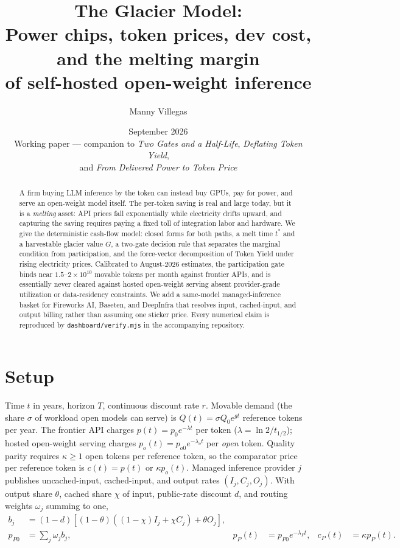 \documentclass[11pt]{article}
\title{The Glacier Model:\\ \large Power chips, token prices, dev cost, and the melting margin\\
of self-hosted open-weight inference}
\author{Manny Villegas}
\date{September 2026 \\ \small Working paper --- companion to \emph{Two Gates and a Half-Life},
\emph{Deflating Token Yield},\\ \small and \emph{From Delivered Power to Token Price}}
\begin{document}
\maketitle

\begin{abstract}
A firm buying LLM inference by the token can instead buy GPUs, pay for power, and serve an
open-weight model itself. The per-token saving is real and large today, but it is a
\emph{melting} asset: API prices fall exponentially while electricity drifts upward, and
capturing the saving requires paying a fixed toll of integration labor and hardware. We
give the deterministic cash-flow model: closed forms for both paths, a melt time $t^\ast$
and a harvestable glacier value $G$, a two-gate decision rule that separates the marginal
condition from participation, and the force-vector decomposition of Token Yield under
rising electricity prices. Calibrated to August-2026 estimates, the participation gate
binds near $1.5$--$2\times 10^{10}$ movable tokens per month against frontier APIs, and is
essentially never cleared against hosted open-weight serving absent provider-grade
utilization or data-residency constraints. We add a same-model managed-inference basket
for Fireworks AI, Baseten, and DeepInfra that resolves input, cached-input, and output
billing rather than assuming one sticker price. Every numerical claim is reproduced by
\texttt{dashboard/verify.mjs} in the accompanying repository.
\end{abstract}

\section{Setup}
Time $t$ in years, horizon $T$, continuous discount rate $r$. Movable demand (the share
$\sigma$ of workload open models can serve) is $Q(t)=\sigma Q_0 e^{gt}$ reference tokens
per year. The frontier API charges $p(t)=p_0 e^{-\lambda t}$ per token
($\lambda=\ln 2/t_{1/2}$); hosted open-weight serving charges $p_o(t)=p_{o0}e^{-\lambda_o t}$
per \emph{open} token. Quality parity requires $\kappa\ge 1$ open tokens per reference
token, so the comparator price per reference token is $c(t)=p(t)$ or $\kappa p_o(t)$.
Managed inference provider $j$ publishes uncached-input, cached-input, and output rates
$(I_j,C_j,O_j)$. With output share $\theta$, cached share $\chi$ of input, public-rate
discount $d$, and routing weights $\omega_j$ summing to one,
\begin{align}
b_j&=(1-d)\left[(1-\theta)((1-\chi)I_j+\chi C_j)+\theta O_j\right],\\
p_{P0}&=\sum_j\omega_jb_j, & p_P(t)&=p_{P0}e^{-\lambda_Pt}, & c_P(t)&=\kappa p_P(t).
\label{eq:provider}
\end{align}
\end{document}
